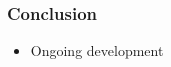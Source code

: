 \documentclass[xcolor={x11names, rgb, usenames, dvipsnames}]{beamer}
\begin{document}
\begin{frame}
\frametitle{Conclusion}
\begin{itemize}
	\item Ongoing development
\end{itemize}

\end{frame}




% 
% 
\end{document}
